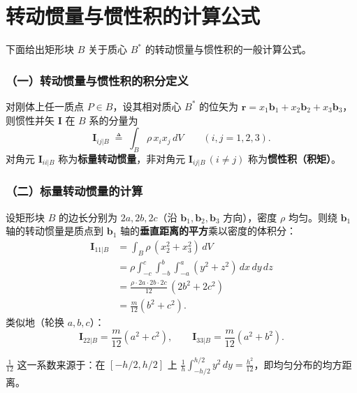 \section{转动惯量与惯性积的计算公式}

下面给出矩形块 $B$ 关于质心 $B^{*}$ 的转动惯量与惯性积的一般计算公式。

\subsubsection*{（一）转动惯量与惯性积的积分定义}
对刚体上任一质点 $P\in B$，设其相对质心 $B^{*}$ 的位矢为 $\boldsymbol{r}=x_{1}\boldsymbol{b}_{1}+x_{2}\boldsymbol{b}_{2}+x_{3}\boldsymbol{b}_{3}$，则惯性并矢 $\mathbf{I}$ 在 $B$ 系的分量为
\begin{equation}
    \mathbf{I}_{ij|B}\;\triangleq\;\int_{B}\rho\,x_{i}x_{j}\,dV \qquad (i,j=1,2,3).
\end{equation}
对角元 $\mathbf{I}_{ii|B}$ 称为\textbf{标量转动惯量}，非对角元 $\mathbf{I}_{ij|B}\,(i\neq j)$ 称为\textbf{惯性积（积矩）}。

\subsubsection{（二）标量转动惯量的计算}
设矩形块 $B$ 的边长分别为 $2a,2b,2c$（沿 $\boldsymbol{b}_{1},\boldsymbol{b}_{2},\boldsymbol{b}_{3}$ 方向），密度 $\rho$ 均匀。则绕 $\boldsymbol{b}_{1}$ 轴的转动惯量是质点到 $\boldsymbol{b}_{1}$ 轴的\textbf{垂直距离的平方}乘以密度的体积分：
\begin{equation}
\begin{aligned}
\mathbf{I}_{11|B}
  &= \int_{B}\rho\,(x_{2}^{2}+x_{3}^{2})\,dV \\
  &= \rho\int_{-c}^{c}\!\!\int_{-b}^{b}\!\!\int_{-a}^{a}(y^{2}+z^{2})\,dx\,dy\,dz \\
  &= \frac{\rho\cdot 2a\cdot 2b\cdot 2c}{12}\,(2b^{2}+2c^{2}) \\
  &= \frac{m}{12}(b^{2}+c^{2}).
\end{aligned}
\end{equation}
类似地（轮换 $a,b,c$）：
\begin{equation}
    \mathbf{I}_{22|B}=\frac{m}{12}(a^{2}+c^{2}),\qquad
    \mathbf{I}_{33|B}=\frac{m}{12}(a^{2}+b^{2}).
\end{equation}

$\frac{1}{12}$ 这一系数来源于：在 $[-h/2,h/2]$ 上 $\displaystyle\frac{1}{h}\int_{-h/2}^{h/2}y^{2}\,dy=\frac{h^{2}}{12}$，即均匀分布的均方距离。

